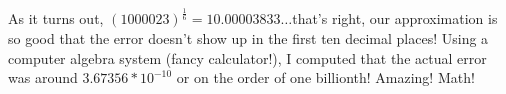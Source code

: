 \documentclass[english]{article}
\theoremstyle{remark}
\theoremstyle{definition}
\begin{document}
As it turns out, $(1000023)^{\frac{1}{6}}=10.00003833\hdots$\textemdash that's right, our approximation is so good that the error doesn't show up in the first ten decimal places! Using a computer algebra system (fancy calculator!), I computed that the actual error was around $3.67356*10^{-10}$ or on the order of one billionth! Amazing! Math!
\end{document}
